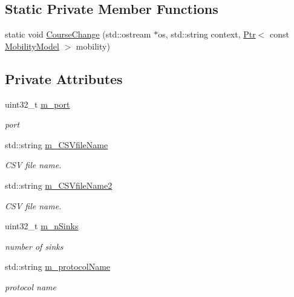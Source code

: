 \subsection*{Static Private Member Functions}
\begin{DoxyCompactItemize}
\item 
static void \hyperlink{classVanetRoutingExperiment_a8ada2acdbc365c03785b1db5c93153db}{Course\+Change} (std\+::ostream $\ast$os, std\+::string context, \hyperlink{classns3_1_1Ptr}{Ptr}$<$ const \hyperlink{classns3_1_1MobilityModel}{Mobility\+Model} $>$ mobility)
\end{DoxyCompactItemize}
\subsection*{Private Attributes}
\begin{DoxyCompactItemize}
\item 
uint32\+\_\+t \hyperlink{classVanetRoutingExperiment_ab49e9c29d970f6519fffa45c8285a180}{m\+\_\+port}
\begin{DoxyCompactList}\small\item\em port \end{DoxyCompactList}\item 
std\+::string \hyperlink{classVanetRoutingExperiment_a0fab315c81d7da9e59216c3790f55da4}{m\+\_\+\+C\+S\+Vfile\+Name}
\begin{DoxyCompactList}\small\item\em C\+SV file name. \end{DoxyCompactList}\item 
std\+::string \hyperlink{classVanetRoutingExperiment_a8ad342a946c50fa946eeb20fddfd2adc}{m\+\_\+\+C\+S\+Vfile\+Name2}
\begin{DoxyCompactList}\small\item\em C\+SV file name. \end{DoxyCompactList}\item 
uint32\+\_\+t \hyperlink{classVanetRoutingExperiment_ab17a92877232a685d02e7980368e6ba5}{m\+\_\+n\+Sinks}
\begin{DoxyCompactList}\small\item\em number of sinks \end{DoxyCompactList}\item 
std\+::string \hyperlink{classVanetRoutingExperiment_a59e637db2de3f919b261e4b733285f44}{m\+\_\+protocol\+Name}
\begin{DoxyCompactList}\small\item\em protocol name \end{DoxyCompactList}\item 

\end{DoxyCompactItemize}
